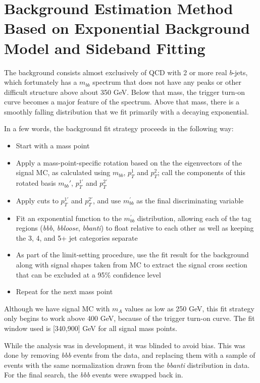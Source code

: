 \section{Background Estimation Method Based on Exponential Background Model and Sideband Fitting}
The background consists almost exclusively of QCD with 2 or more real $b$-jets, which 
fortunately has a $m_{bb}$ spectrum that does not have any peaks or other difficult
structure above about 350 GeV.  Below that mass, the trigger turn-on curve becomes
a major feature of the spectrum.  Above that mass, there
is a smoothly falling distribution that we fit primarily with a decaying exponential.

In a few words, the background fit strategy proceeds in the following way:
\begin{itemize}
    \item Start with a mass point
    \item Apply a mass-point-specific rotation based on the the eigenvectors of 
    the signal MC, as calculated using $m_{bb}$, $p_{T}^1$ and $p_T^2$; call 
    the components of this rotated basis $m_{bb}'$, $p_T^{1'}$ and $p_T^{2'}$
    \item Apply cuts to $p_T^{1'}$ and $p_T^{2'}$, and use $m_{bb}^{'}$ as the final 
    discriminating variable 
    \item Fit an exponential function to the $m_{bb}^{'}$ distribution, allowing each of the 
tag regions (\textit{bbb}, \textit{bbloose}, \textit{bbanti}) to float relative to each other
 as well as keeping the 3, 4, and 5+ jet categories separate
    \item As part of the limit-setting procedure, use the fit result for the 
    background along with signal shapes taken from MC to extract the 
signal cross section that can be excluded at a 95\% confidence level
    \item Repeat for the next mass point
\end{itemize}

Although we have signal MC with $m_A$ values as low as 250 GeV, this fit strategy only
begins to work above 400 GeV, because of the trigger turn-on curve.  The fit window
used is [340,900] GeV for all signal mass points.

While the analysis was in development, it was blinded to avoid bias.  This was done 
by removing \textit{bbb} events from the data, and replacing them with a sample of
events with the same normalization drawn from the \textit{bbanti} distribution
in data.  For the final search, the \textit{bbb} events were swapped back in.



